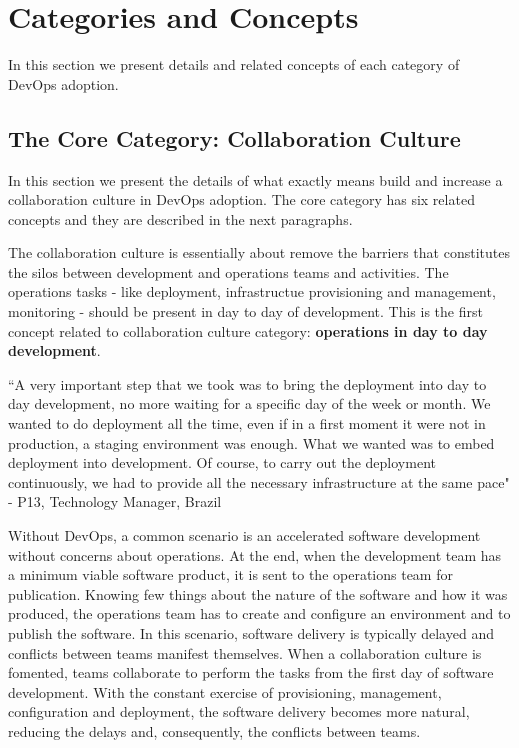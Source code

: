 \section{Categories and Concepts} \label{sec:categories_concepts}
In this section we present details and related concepts of each category of
DevOps adoption.

\subsection{The Core Category: Collaboration Culture}
In this section we present the details of what exactly means build and
increase a collaboration culture in DevOps adoption. The core category has six
related concepts and they are described in the next paragraphs.

The collaboration culture is essentially about remove the barriers that
constitutes the silos between development and operations teams and activities.
The operations tasks - like deployment, infrastructue provisioning and
management, monitoring - should be present in day to day of development. This
is the first concept related to collaboration culture category:
\textbf{operations in day to day development}.

``A very important step that we took was to bring the deployment into day to day
development, no more waiting for a specific day of the week or month. We wanted
to do deployment all the time, even if in a first moment it were not in
production, a staging environment was enough. What we wanted was to embed
deployment into development. Of course, to carry out the deployment
continuously, we had to provide all the necessary infrastructure at the same
pace" - P13, Technology Manager, Brazil

Without DevOps, a common scenario is an accelerated software development
without concerns about operations. At the end, when the development team has a
minimum viable software product, it is sent to the operations team for
publication. Knowing few things about the nature of the software and how it
was produced, the operations team has to create and configure an environment
and to publish the software. In this scenario, software delivery is typically
delayed and conflicts between teams manifest themselves. When a collaboration
culture is fomented, teams collaborate to perform the tasks from the first day
of software development. With the constant exercise of provisioning, management,
configuration and deployment, the software delivery becomes more natural,
reducing the delays and, consequently, the conflicts between teams.

